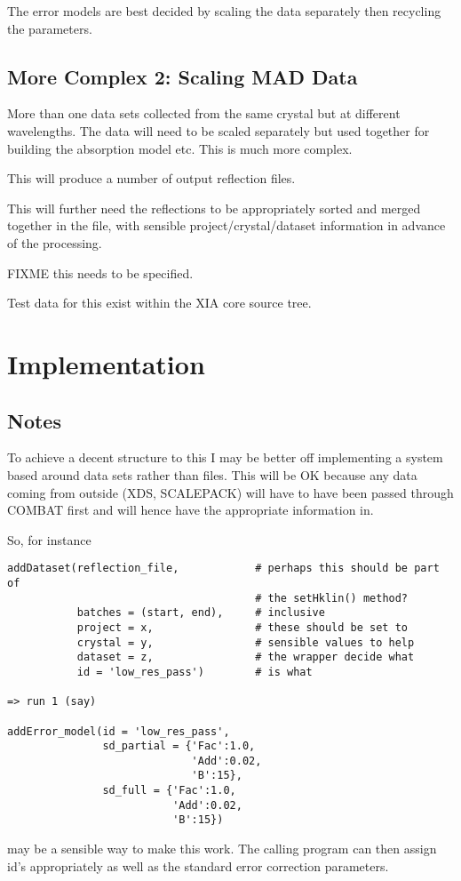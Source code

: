 \documentclass[a4paper, 11pt]{article}
\begin{document}
The error models are best decided by scaling the data separately then 
recycling the parameters.

\subsection{More Complex 2: Scaling MAD Data}

More than one data sets collected from the same crystal but at different 
wavelengths. The data will need to be scaled separately but used together
for building the absorption model etc. This is much more complex.

This will produce a number of output reflection files.

This will further need the reflections to be appropriately sorted and 
merged together in the file, with sensible project/crystal/dataset information
in advance of the processing.

FIXME this needs to be specified.

Test data for this exist within the XIA core source tree.

\section{Implementation}

\subsection{Notes}

To achieve a decent structure to this I may be better off implementing a 
system based around data sets rather than files. This will be OK because 
any data coming from outside (XDS, SCALEPACK) will have to have been passed
through COMBAT first and will hence have the appropriate information in.

So, for instance

{
\tiny
\begin{verbatim}
addDataset(reflection_file,            # perhaps this should be part of
                                       # the setHklin() method?
           batches = (start, end),     # inclusive
           project = x,                # these should be set to
           crystal = y,                # sensible values to help
           dataset = z,                # the wrapper decide what
           id = 'low_res_pass')        # is what

=> run 1 (say)

addError_model(id = 'low_res_pass',
               sd_partial = {'Fac':1.0,
                             'Add':0.02,
                             'B':15},
               sd_full = {'Fac':1.0,
                          'Add':0.02,
                          'B':15})
\end{verbatim}
}
\noindent
may be a sensible way to make this work. The calling program can then assign
id's appropriately as well as the standard error correction parameters.
\end{document}
